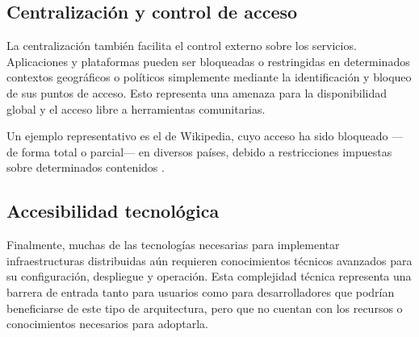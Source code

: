 \subsection{Centralización y control de acceso}

La centralización también facilita el control externo sobre los servicios. Aplicaciones y plataformas pueden ser bloqueadas o restringidas en determinados contextos geográficos o políticos simplemente mediante la identificación y bloqueo de sus puntos de acceso. Esto representa una amenaza para la disponibilidad global y el acceso libre a herramientas comunitarias.

Un ejemplo representativo es el de Wikipedia, cuyo acceso ha sido bloqueado —de forma total o parcial— en diversos países, debido a restricciones impuestas sobre determinados contenidos \parencite{censorship-wikipedia}.

\subsection{Accesibilidad tecnológica}

Finalmente, muchas de las tecnologías necesarias para implementar infraestructuras distribuidas aún requieren conocimientos técnicos avanzados para su configuración, despliegue y operación. Esta complejidad técnica representa una barrera de entrada tanto para usuarios como para desarrolladores que podrían beneficiarse de este tipo de arquitectura, pero que no cuentan con los recursos o conocimientos necesarios para adoptarla.